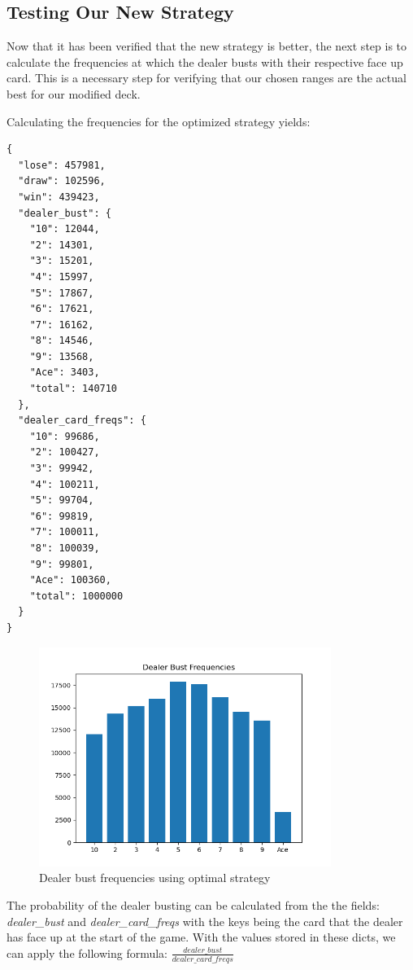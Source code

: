 \documentclass{article}
\begin{document}
{        \subsection{Testing Our New Strategy}
        \label{Testing Our New Strategy}
		
		Now that it has been verified that the new strategy is better, the next step is to calculate the frequencies
		at which the dealer busts with their respective face up card. This is a necessary step for verifying that our 
		chosen ranges are the actual best for our modified deck.

		Calculating the frequencies for the optimized strategy yields:

        \begin{verbatim}
{
  "lose": 457981,
  "draw": 102596,
  "win": 439423,
  "dealer_bust": {
    "10": 12044,
    "2": 14301,
    "3": 15201,
    "4": 15997,
    "5": 17867,
    "6": 17621,
    "7": 16162,
    "8": 14546,
    "9": 13568,
    "Ace": 3403,
    "total": 140710
  },
  "dealer_card_freqs": {
    "10": 99686,
    "2": 100427,
    "3": 99942,
    "4": 100211,
    "5": 99704,
    "6": 99819,
    "7": 100011,
    "8": 100039,
    "9": 99801,
    "Ace": 100360,
    "total": 1000000
  }
}
        \end{verbatim}

		\begin{figure}[H]
			\hypertarget{fig5}{}
			\begin{center}
				\includegraphics[width=9.5cm]{bust-data-optimal.png}
				\caption{Dealer bust frequencies using optimal strategy}
			\end{center}
		\end{figure}

		The probability of the dealer busting can be calculated from the the fields: \textit{dealer\_bust} and 
		\textit{dealer\_card\_freqs} with the keys being the card that 
		the dealer has face up at the start of the game. With the values stored in these dicts, we can apply the following formula:
		$\frac{dealer\_bust}{dealer\_card\_freqs}$ 

}
\end{document}
